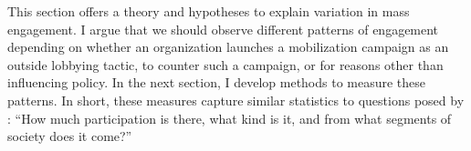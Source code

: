 

This section offers a theory and hypotheses to explain variation in mass engagement.
I argue that we should observe different patterns of engagement depending on whether an organization launches a mobilization campaign as an outside lobbying tactic, to counter such a campaign, or for reasons other than influencing policy. In the next section, I develop methods to measure these patterns. In short, these measures capture similar statistics to questions posed by \citet[p. 9]{Verba1987}: ``How much participation is there, what kind is it, and from what segments of society does it come?'' %


